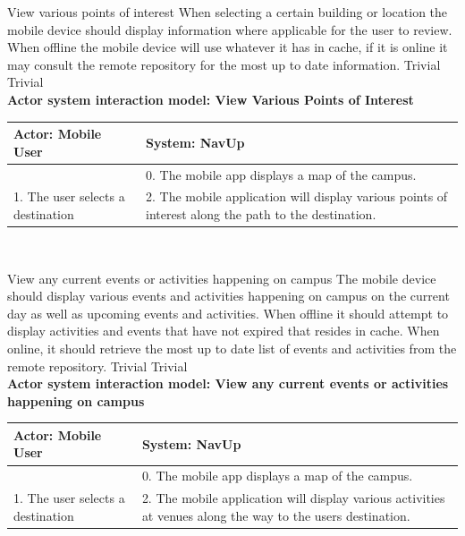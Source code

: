 \FuncReq
{View various points of interest}
{When selecting a certain building or location the mobile device should display information where applicable for the user to review. When offline the mobile device will use whatever it has in cache, if it is online it may consult the remote repository for the most up to date information.}
{Trivial}
{Trivial}
	\\
    \textbf{Actor system interaction model: View Various Points of Interest }\\
    \begin{tabular}{ | p{6cm} | p{6cm} |}
    \hline
    Actor: Mobile User & System: NavUp \\ \hline
    & 0. The mobile app displays a map of the campus.\\ \hline
    1. The user selects a destination & 2. The mobile application will display various points of interest along the path to the destination.\\ \hline
    \end{tabular}
\\
\bigskip

\FuncReq
{View any current events or activities happening on campus}
{The mobile device should display various events and activities happening on campus on the current day as well as upcoming events and activities. When offline it should attempt to display activities and events that have not expired that resides in cache. When online, it should retrieve the most up to date list of events and activities from the remote repository.}
{Trivial}
{Trivial}
	\\
    \textbf{Actor system interaction model: View any current events or activities happening on campus }\\
    \begin{tabular}{ | p{6cm} | p{6cm} |}
    \hline
    Actor: Mobile User & System: NavUp \\ \hline
    & 0. The mobile app displays a map of the campus.\\ \hline
    1. The user selects a destination & 2. The mobile application will display various activities at venues along the way to the users destination.
    \\ \hline
    \end{tabular}
\\
\bigskip

